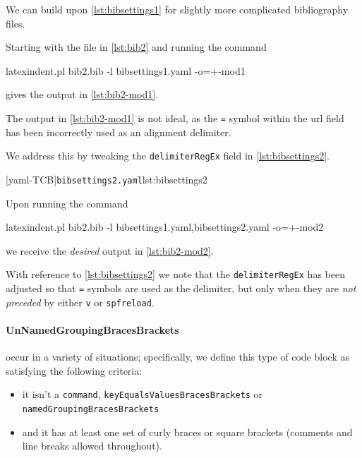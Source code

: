   \begin{example}
  We can build upon \cref{lst:bibsettings1} for slightly more complicated bibliography
  files.

  Starting with the file in \cref{lst:bib2} and running the command

  \begin{commandshell}
latexindent.pl bib2.bib -l bibsettings1.yaml -o=+-mod1 
   \end{commandshell}

  gives the output in \cref{lst:bib2-mod1}.

  \begin{widepage}
  \end{widepage}

  The output in \cref{lst:bib2-mod1} is not ideal, as the \texttt{=} symbol within the
  url field has been incorrectly used as an alignment delimiter.

  We address this by tweaking the \texttt{delimiterRegEx} field in
  \cref{lst:bibsettings2}.

  [yaml-TCB]{\texttt{bibsettings2.yaml}}{lst:bibsettings2}

  Upon running the command

  \begin{commandshell}
latexindent.pl bib2.bib -l bibsettings1.yaml,bibsettings2.yaml -o=+-mod2 
         \end{commandshell}

  we receive the \emph{desired} output in \cref{lst:bib2-mod2}.


  With reference to \cref{lst:bibsettings2} we note that the \texttt{delimiterRegEx} has
  been adjusted so that \texttt{=} symbols are used as the delimiter, but only when they
  are \emph{not preceded} by either \texttt{v} or \texttt{spfreload}.
  \end{example}

 \paragraph{UnNamedGroupingBracesBrackets} occur in a variety of situations;
  specifically, we define this type of code block as satisfying the following
  criteria:
  \begin{itemize}
   \item it isn't a \texttt{command}, \texttt{keyEqualsValuesBracesBrackets} or
         \texttt{namedGroupingBracesBrackets}
   \item and it has at least one set of curly braces or square brackets (comments and
         line breaks allowed throughout).
  \end{itemize}

